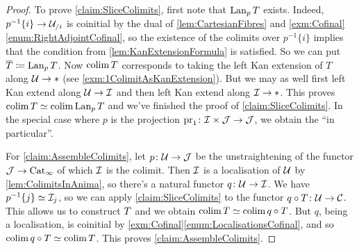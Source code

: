 \begin{proof}
	To prove \cref{claim:SliceColimits}, first note that $\operatorname{Lan}_pT$ exists. Indeed, $p^{-1}\{i\}\rightarrow \mathcal{U}_{/i}$ is coinitial by the dual of \cref{lem:CartesianFibres} and \cref{exm:Cofinal}\cref{enum:RightAdjointCofinal}, so the existence of the colimits over $p^{-1}\{i\}$ implies that the condition from \cref{lem:KanExtensionFormula} is satisfied. So we can put $\ov T\coloneqq \Lan_pT$. Now $\operatorname*{colim} T$ corresponds to taking the left Kan extension of $T$ along $\mathcal{U}\rightarrow *$ (see \cref{exm:1ColimitAsKanExtension}). But we may as well first left Kan extend along $\mathcal{U}\rightarrow \mathcal{I}$ and then left Kan extend along $\mathcal{I}\rightarrow *$. This proves $\operatorname*{colim} T\simeq \operatorname*{colim} \operatorname{Lan}_pT$ and we've finished the proof of \cref{claim:SliceColimits}. In the special case where $p$ is the projection $\operatorname{pr}_1\colon \mathcal{I}\times\mathcal{J}\rightarrow \mathcal{J}$, we obtain the \enquote{in particular}.
	
	For \cref{claim:AssembleColimits}, let $p\colon \mathcal{U}\rightarrow \mathcal{J}$ be the unstraightening of the functor $\mathcal{J}\rightarrow \mathrm{Cat}_\infty$ of which $\mathcal{I}$ is the colimit. Then $\mathcal{I}$ is a localisation of $\mathcal{U}$ by \cref{lem:ColimitsInAnima}, so there's a natural functor $q\colon \mathcal{U}\rightarrow\mathcal{I}$. We have $p^{-1}\{j\}\simeq \mathcal{I}_j$, so we can apply \cref{claim:SliceColimits} to the functor $q\circ T\colon \mathcal{U}\rightarrow \mathcal{C}$. This allows us to construct $\ov T$ and we obtain $\colimit \ov T\simeq \colimit q\circ T$. But $q$, being a localisation, is coinitial by \cref{exm:Cofinal}\cref{enum:LocalisationsCofinal}, and so $\operatorname*{colim} q\circ T\simeq \operatorname*{colim} T$. This proves \cref{claim:AssembleColimits}.
\end{proof}
